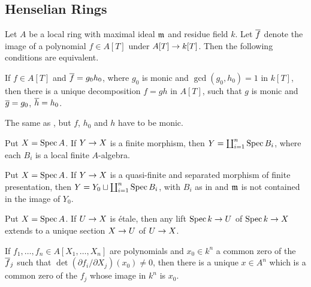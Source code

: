 \subsection{Henselian Rings}
\begin{prop}\label{prop:henselian}
	Let $A$ be a local ring with maximal ideal $\mathfrak{m}$ and residue field $k$. Let $\ov{f}$ denote the image of a polynomial $f\in A[T]$ under $A[T]\morphism k[T]$. Then the following conditions are equivalent.
	\begin{alphanumerate}
		\item If $f\in A[T]$ and $\ov{f}=g_0h_0$, where $g_0$ is monic and $\gcd(g_0,h_0)=1$ in $k[T]$, then there is a unique decomposition $f=gh$ in $A[T]$, such that $g$ is monic and $\ov{g}=g_0$, $\ov{h}=h_0$.
		\item The same as , but $f$, $h_0$ and $h$ have to be monic.
		\item Put $X=\operatorname{Spec} A$. If $Y\morphism X$ is a finite morphism, then $Y=\coprod_{i=1}^n\operatorname{Spec} B_i$, where each $B_i$ is a local finite $A$-algebra.
		\item Put $X=\operatorname{Spec} A$. If $Y\morphism X$ is a quasi-finite and separated morphism of finite presentation, then $Y=Y_0\sqcup\coprod_{i=1}^n\operatorname{Spec} B_i$, with $B_i$ as in  and $\mathfrak{m}$ is not contained in the image of $Y_0$.
		\item Put $X=\operatorname{Spec} A$. If $U\morphism X$ is étale, then any lift $\Spec k\morphism U$ of $\Spec k\morphism X$ extends to a unique section $X\morphism U$ of $U\morphism X$.
		\item If $f_1,\dotsc,f_n\in A[X_1,\dotsc,X_n]$ are polynomials and $x_0\in k^n$ a common zero of the $\ov{f}_j$ such that $\det(\partial f_i/\partial X_j)(x_0)\neq 0$, then there is a unique $x\in A^n$ which is a common zero of the $f_j$ whose image in $k^n$ is $x_0$.
	\end{alphanumerate}
\end{prop}
